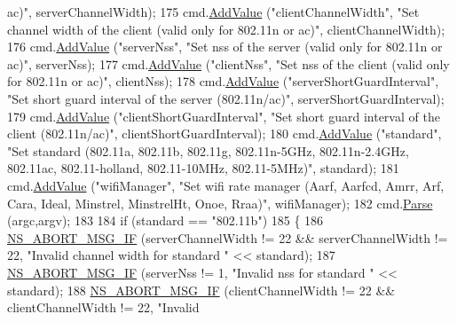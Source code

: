 \begin{DoxyCode}
{       ac)"}, serverChannelWidth);
175   cmd.\hyperlink{classns3_1_1CommandLine_addcfb546c7ad4c8bd0965654d55beb8e}{AddValue} (\textcolor{stringliteral}{"clientChannelWidth"}, \textcolor{stringliteral}{"Set channel width of the client (valid only for 802.11n or
       ac)"}, clientChannelWidth);
176   cmd.\hyperlink{classns3_1_1CommandLine_addcfb546c7ad4c8bd0965654d55beb8e}{AddValue} (\textcolor{stringliteral}{"serverNss"}, \textcolor{stringliteral}{"Set nss of the server (valid only for 802.11n or ac)"}, serverNss);
177   cmd.\hyperlink{classns3_1_1CommandLine_addcfb546c7ad4c8bd0965654d55beb8e}{AddValue} (\textcolor{stringliteral}{"clientNss"}, \textcolor{stringliteral}{"Set nss of the client (valid only for 802.11n or ac)"}, clientNss);
178   cmd.\hyperlink{classns3_1_1CommandLine_addcfb546c7ad4c8bd0965654d55beb8e}{AddValue} (\textcolor{stringliteral}{"serverShortGuardInterval"}, \textcolor{stringliteral}{"Set short guard interval of the server (802.11n/ac)"}, 
      serverShortGuardInterval);
179   cmd.\hyperlink{classns3_1_1CommandLine_addcfb546c7ad4c8bd0965654d55beb8e}{AddValue} (\textcolor{stringliteral}{"clientShortGuardInterval"}, \textcolor{stringliteral}{"Set short guard interval of the client (802.11n/ac)"}, 
      clientShortGuardInterval);
180   cmd.\hyperlink{classns3_1_1CommandLine_addcfb546c7ad4c8bd0965654d55beb8e}{AddValue} (\textcolor{stringliteral}{"standard"}, \textcolor{stringliteral}{"Set standard (802.11a, 802.11b, 802.11g, 802.11n-5GHz, 802.11n-2.4GHz,
       802.11ac, 802.11-holland, 802.11-10MHz, 802.11-5MHz)"}, standard);
181   cmd.\hyperlink{classns3_1_1CommandLine_addcfb546c7ad4c8bd0965654d55beb8e}{AddValue} (\textcolor{stringliteral}{"wifiManager"}, \textcolor{stringliteral}{"Set wifi rate manager (Aarf, Aarfcd, Amrr, Arf, Cara, Ideal,
       Minstrel, MinstrelHt, Onoe, Rraa)"}, wifiManager);
182   cmd.\hyperlink{classns3_1_1CommandLine_a5c10b85b3207e5ecb48d907966923156}{Parse} (argc,argv);
183 
184   \textcolor{keywordflow}{if} (standard == \textcolor{stringliteral}{"802.11b"})
185     \{
186       \hyperlink{group__fatal_ga6653324225bc139e46deea177614ceee}{NS\_ABORT\_MSG\_IF} (serverChannelWidth != 22 && serverChannelWidth != 22, \textcolor{stringliteral}{"Invalid
       channel width for standard "} << standard);
187       \hyperlink{group__fatal_ga6653324225bc139e46deea177614ceee}{NS\_ABORT\_MSG\_IF} (serverNss != 1, \textcolor{stringliteral}{"Invalid nss for standard "} << standard);
188       \hyperlink{group__fatal_ga6653324225bc139e46deea177614ceee}{NS\_ABORT\_MSG\_IF} (clientChannelWidth != 22 && clientChannelWidth != 22, \textcolor{stringliteral}{"Invalid
}
\end{DoxyCode}
